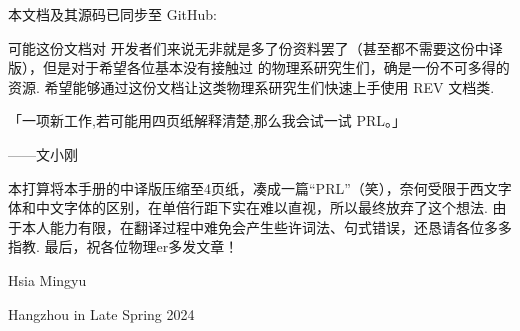 \documentclass[twocolumn, amssymb, bibnotes, aps, prd, 10pt]{revtex4-2}
\newcommand{\revtex}{REV\hologo{TeX}}
\begin{document}
本文档及其源码已同步至 GitHub:  

可能这份文档对 开发者们来说无非就是多了份资料罢了（甚至都不需要这份中译版），但是对于希望各位基本没有接触过 的物理系研究生们，确是一份不可多得的资源. 希望能够通过这份文档让这类物理系研究生们快速上手使用 {\revtex} 文档类.

\begin{center}
    「一项新工作,若可能用四页纸解释清楚,那么我会试一试 PRL。」

    \hfill ——文小刚
\end{center}

本打算将本手册的中译版压缩至4页纸，凑成一篇``PRL''（笑），奈何受限于西文字体和中文字体的区别，在单倍行距下实在难以直视，所以最终放弃了这个想法. 由于本人能力有限，在翻译过程中难免会产生些许词法、句式错误，还恳请各位多多指教. 最后，祝各位物理er多发文章！

\vfill\raggedleft
Hsia Mingyu

Hangzhou in Late Spring 2024
\end{document}
